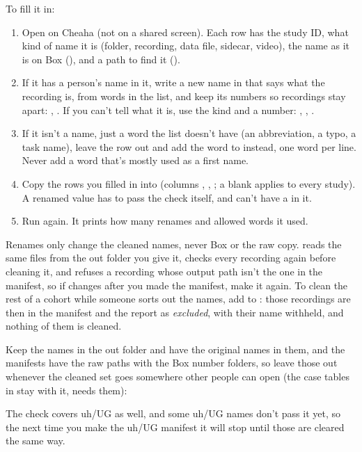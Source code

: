 To fill it in:
\begin{enumerate}
  \item Open  on Cheaha (not on a shared screen). Each row has the study ID, what kind of name it is (folder, recording, data file, sidecar, video), the name as it is on Box (), and a path to find it ().
  \item If it has a person's name in it, write a new name in  that says what the recording is, from words in the list, and keep its numbers so recordings stay apart: , . If you can't tell what it is, use the kind and a number: , , .
  \item If it isn't a name, just a word the list doesn't have (an abbreviation, a typo, a task name), leave the row out and add the word to  instead, one word per line. Never add a word that's mostly used as a first name.
  \item Copy the rows you filled in into  (columns , , ; a blank  applies to every study). A renamed value has to pass the check itself, and can't have a \code{/} in it.
  \item Run  again. It prints how many renames and allowed words it used.
\end{enumerate}
Renames only change the cleaned names, never Box or the raw copy.  reads the same files from the out folder you give it, checks every recording again before cleaning it, and refuses a recording whose output path isn't the one in the manifest, so if  changes after you made the manifest, make it again. To clean the rest of a cohort while someone sorts out the names, add  to : those recordings are then in the manifest and the report as \textit{excluded}, with their name withheld, and nothing of them is cleaned.

\begin{careful}{Keep the names in the out folder}
 and  have the original names in them, and the manifests have the raw paths with the Box number folders, so leave those out whenever the cleaned set goes somewhere other people can open (the case tables in  stay with it,  needs them):
The check covers uh/UG as well, and some uh/UG names don't pass it yet, so the next time you make the uh/UG manifest it will stop until those are cleared the same way.
\end{careful}

